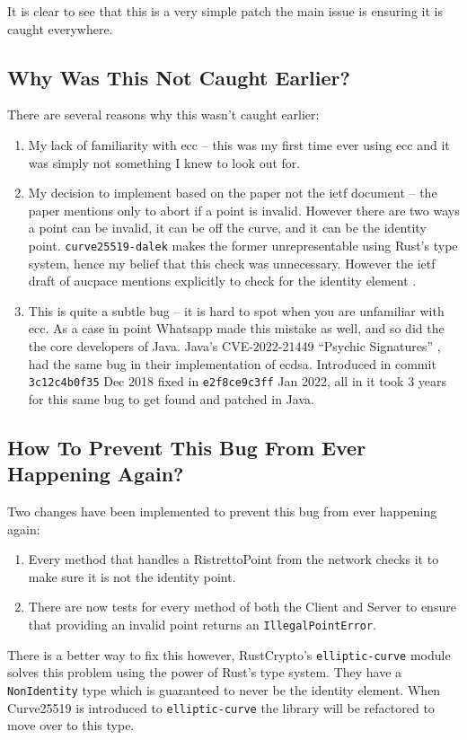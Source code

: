 It is clear to see that this is a very simple patch the main issue is ensuring it is caught everywhere.

\subsection{Why Was This Not Caught Earlier?}
There are several reasons why this wasn't caught earlier:
\begin{enumerate}
  \item{My lack of familiarity with \gls{ecc} -- this was my first time ever using \gls{ecc} and it was simply not something I knew to look out for.}
  \item{My decision to implement based on the paper not the \gls{ietf} document -- the paper mentions only to abort if a point is invalid. However there are two ways a point can be invalid, it can be off the curve, and it can be the identity point. \texttt{curve25519-dalek} makes the former unrepresentable using Rust's type system, hence my belief that this check was unnecessary. However the \gls{ietf} draft of \gls{aucpace} mentions explicitly to check for the identity element \cite{ietf-aucpace}.}
  \item{This is quite a subtle bug -- it is hard to spot when you are unfamiliar with \gls{ecc}. As a case in point Whatsapp made this mistake as well, and so did the the core developers of Java. Java's CVE-2022-21449 \enquote{Psychic Signatures} \cite{java-psychic-signatures}, had the same bug in their implementation of \gls{ecdsa}. Introduced in commit \texttt{3c12c4b0f35} Dec 2018 fixed in \texttt{e2f8ce9c3ff} Jan 2022, all in it took 3 years for this same bug to get found and patched in Java.}
\end{enumerate}

\subsection{How To Prevent This Bug From Ever Happening Again?}
Two changes have been implemented to prevent this bug from ever happening again:
\begin{enumerate}
  \item{Every method that handles a RistrettoPoint from the network checks it to make sure it is not the identity point.}
  \item{There are now tests for every method of both the Client and Server to ensure that providing an invalid point returns an \texttt{IllegalPointError}.}
\end{enumerate}

There is a better way to fix this however, RustCrypto's \texttt{elliptic-curve} module solves this problem using the power of Rust's type system.
They have a \texttt{NonIdentity} type which is guaranteed to never be the identity element.
When Curve25519 is introduced to \texttt{elliptic-curve} the library will be refactored to move over to this type.

